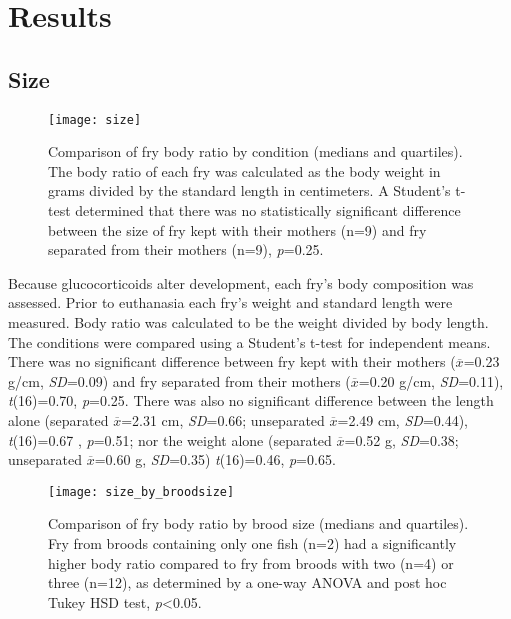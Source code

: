 \documentclass[12pt,twoside]{reedthesis}
\begin{document}
\chapter{Results}
\section{Size}

\begin{figure}[htbp] 
\begin{center} 
\texttt{[image: size]}
\caption[Comparison of fry body ratio by condition]{\footnotesize{Comparison of fry body
      ratio by condition (medians and quartiles). \\ The body ratio of each fry
    was calculated as the body weight in grams divided by the standard length in
    centimeters. A Student's t-test determined that there was no
    statistically significant difference between the size of fry kept with their
    mothers (n=9) and fry separated from their
  mothers (n=9), \textit{p}=0.25}.}
\label{subd}
\end{center} 
\end{figure}

Because glucocorticoids alter development, each
fry's body
composition was assessed. Prior to euthanasia each fry's weight and standard length were measured. 
Body ratio was calculated to be the weight divided by body length. The conditions were
compared using a Student's t-test for independent means. There was no
significant difference between fry kept with their mothers ($\overline{x}$=0.23 g/cm,
\textit{SD}=0.09) and fry separated from their mothers ($\overline{x}$=0.20 g/cm,
\textit{SD}=0.11), \textit{t}(16)=0.70, \textit{p}=0.25. There was also no
significant difference between the length alone (separated $\overline{x}$=2.31 cm,
\textit{SD}=0.66;
unseparated $\overline{x}$=2.49 cm, \textit{SD}=0.44), \textit{t}(16)=0.67
,
\textit{p}=0.51; nor the weight
alone (separated $\overline{x}$=0.52 g, \textit{SD}=0.38; unseparated $\overline{x}$=0.60 g, \textit{SD}=0.35) \textit{t}(16)=0.46, \textit{p}=0.65.

\begin{figure}[htbp] 
\begin{center} 
\texttt{[image: size\_by\_broodsize]}
\caption[Comparison of fry body ratio by brood size]{\footnotesize{Comparison of fry body
      ratio by brood size (medians and quartiles). \\ Fry from broods containing
      only one fish (n=2) had a significantly higher
body ratio compared to fry from broods with two (n=4) or three (n=12), as determined by a one-way ANOVA and post hoc Tukey HSD test, \textit{p}<0.05.}}
\label{subd}
\end{center} 
\end{figure}
\end{document}
